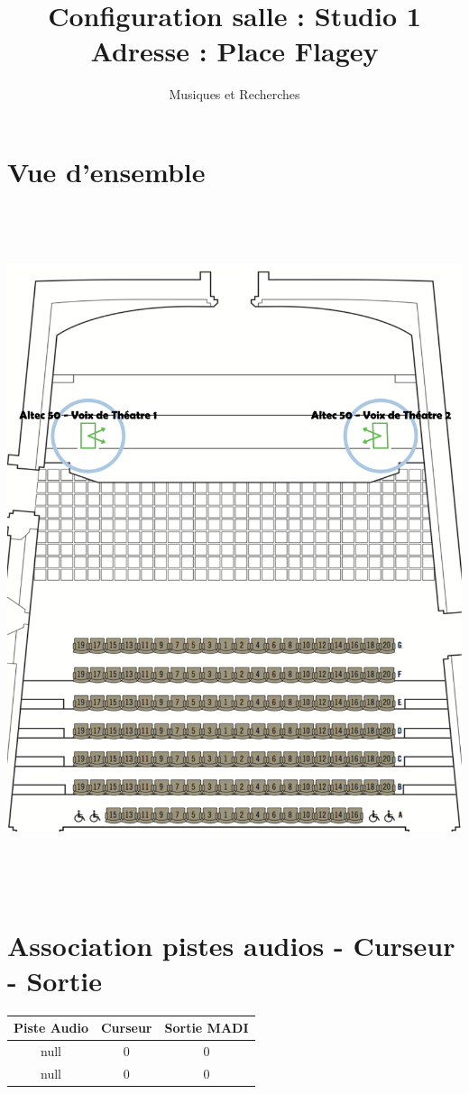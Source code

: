 \documentclass[12pt,a4paper]{report}
\author{Musiques et Recherches}
\title{Configuration salle : Studio 1 \\ Adresse :  Place Flagey}
\begin{document}
\maketitle
\chapter*{Vue d'ensemble}
 \begin{center}
\includegraphics[height=20cm]{data/planSalle123.pdf}
\end{center}
 \chapter*{Association pistes audios - Curseur - Sortie}
 \begin{center}
 \begin{tabular}{|c|c|c|}
 \hline 
 Piste Audio & Curseur & Sortie MADI \\ 
\hline 
null & 0 & 0 \\ 
 \hline 
null & 0 & 0 \\ 
 \hline 

 \end{tabular}  

 \end{center}
\end{document}
